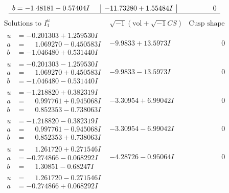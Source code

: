 \documentclass[1p]{elsarticle_modified}
\theoremstyle{definition}
\newcommand{\I}{\sqrt{-1}}
\begin{document}
$$\begin{array}{c|c|c}
\begin{aligned}
b &= -1.48181 - 0.57404 I\end{aligned}
 & -11.73280 + 1.55484 I & \phantom{-0.000000 } 0\\
 \hline 
 \end{array}$$\newpage$$\begin{array}{c|c|c}  
\text{Solutions to }I^u_{1}& \I (\text{vol} + \sqrt{-1}CS) & \text{Cusp shape}\\
 \hline 
\begin{aligned}
u &= -0.201303 + 1.259530 I \\
a &= \phantom{-}1.069270 - 0.450583 I \\
b &= -1.046480 + 0.531440 I\end{aligned}
 & -9.9833 + 13.5973 I & \phantom{-0.000000 } 0 \\ \hline\begin{aligned}
u &= -0.201303 - 1.259530 I \\
a &= \phantom{-}1.069270 + 0.450583 I \\
b &= -1.046480 - 0.531440 I\end{aligned}
 & -9.9833 - 13.5973 I & \phantom{-0.000000 } 0 \\ \hline\begin{aligned}
u &= -1.218820 + 0.382319 I \\
a &= \phantom{-}0.997761 + 0.945068 I \\
b &= \phantom{-}0.852353 - 0.738063 I\end{aligned}
 & -3.30954 + 6.99042 I & \phantom{-0.000000 } 0 \\ \hline\begin{aligned}
u &= -1.218820 - 0.382319 I \\
a &= \phantom{-}0.997761 - 0.945068 I \\
b &= \phantom{-}0.852353 + 0.738063 I\end{aligned}
 & -3.30954 - 6.99042 I & \phantom{-0.000000 } 0 \\ \hline\begin{aligned}
u &= \phantom{-}1.261720 + 0.271546 I \\
a &= -0.274866 - 0.068292 I \\
b &= \phantom{-}1.30851 - 0.68247 I\end{aligned}
 & -4.28726 - 0.95064 I & \phantom{-0.000000 } 0 \\ \hline\begin{aligned}
u &= \phantom{-}1.261720 - 0.271546 I \\
a &= -0.274866 + 0.068292 I \\

\end{aligned}
\end{array}$$
\end{document}
